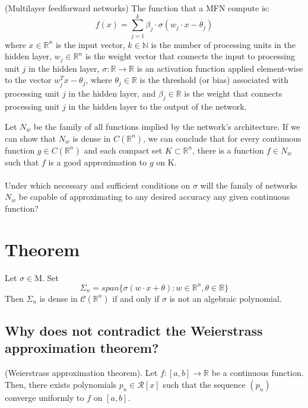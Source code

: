 \documentclass[../main.tex]{subfiles}
\begin{document}
\begin{definition} (Multilayer feedforward networks) The function that a MFN compute is: 
	$$f(x)=\sum_{j=1}^k \beta_j \cdot \sigma(w_j \cdot x - \theta_j)$$
	where $x \in \mathbb{R}^n$ is the input vector, $k \in \mathbb{N}$ is the number of processing units in the hidden layer, $w_j \in \mathbb{R}^n$ is the weight vector that connects the input to processing unit $j$ in the hidden layer, $\sigma : \mathbb{R} \rightarrow \mathbb{R}$ is an activation function applied element-wise to the vector $w_j^T x - \theta_j$, where $\theta_j \in \mathbb{R}$ is the threshold (or bias) associated with processing unit $j$ in the hidden layer, and $\beta_j \in \mathbb{R}$ is the weight that connects processing unit $j$ in the hidden layer to the output of the network.

\end{definition}
\noindent Let $N_{w}$ be the family of all functions implied by the network's architecture.  If we can show that $N_{w}$ is dense in $C(\mathbb{R}^n)$, we can conclude that for every continuous function $g \in C(\mathbb{R}^n) $ and each compact set $K \subset \mathbb{R}^n$, there is a function $f \in N_{w}$ such that $f$ is a good approximation to $g$ on K. \\ \\
\noindent Under which necessary and sufficient conditions on $\sigma$ will the family of networks $N_w$ be capable of approximating to any desired accuracy any given continuous function?


\section{Theorem}
\begin{theorem} Let $ \sigma \in \text{M} $. Set
	$$ \Sigma_n = span\{\sigma(w\cdot x + \theta) : w\in \mathbb{R}^n, \theta \in \mathbb{R} \}$$
	Then $\Sigma_n$ is dense in $\mathcal{C}(\mathbb{R}^n)$ if and only if $\sigma$ is not an algebraic polynomial. 
	
\end{theorem}
\subsection{Why does not contradict the Weierstrass approximation theorem? }


\begin{theorem}(Weierstrass  approximation theorem). 
	Let $f:[a,b]\rightarrow \mathbb{R} $ be a continuous function. Then, there exists polynomials $p_n\in \mathcal{R}[x]$ such that the sequence $(p_n)$ converge uniformly to $f$ on $[a,b]$. 
\end{theorem} 
\end{document}
